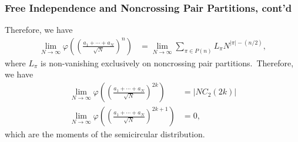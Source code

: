 \documentclass{beamer}
\begin{document}
\begin{frame}
  \frametitle{Free Independence and Noncrossing Pair Partitions, cont'd}
  Therefore, we have
  \begin{align*}
    \lim_{N\rightarrow\infty} \varphi\left( \left( \frac{a_1 + \cdots + a_N}{\sqrt{N}} \right)^{n} \right) &= \lim_{N\rightarrow\infty} \sum_{\pi\in P(n)} L_{\pi}N^{\left\vert \pi \right\vert-(n/2)},
  \end{align*}
  where $L_{\pi}$ is non-vanishing exclusively on noncrossing pair partitions.\pause\ Therefore, we have
  \begin{align*}
    \lim_{N\rightarrow\infty} \varphi\left( \left( \frac{a_1 + \cdots + a_N}{\sqrt{N}} \right)^{2k} \right) &= \left\vert NC_2\left( 2k \right) \right\vert\\
    \lim_{N\rightarrow\infty} \varphi\left( \left( \frac{a_1 + \cdots + a_N}{\sqrt{N}} \right)^{2k+1} \right) &= 0,
  \end{align*}
  which are the moments of the semicircular distribution.
\end{frame}
%
\end{document}
